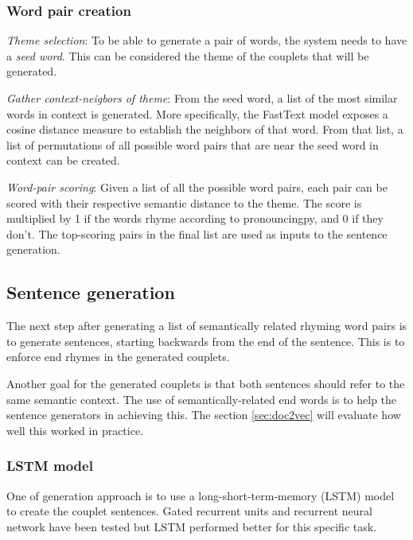 \documentclass[11pt,a4paper]{article}
\newenvironment{tight_enumerate}{
\begin{enumerate}
\setlength{\itemsep}{0pt}
\setlength{\parskip}{0pt}
}{\end{enumerate}}
\begin{document}
\subsubsection{Word pair creation}
\begin{tight_enumerate}
	\item \textit{Theme selection}: To be able to generate a pair of words, the system needs to have a \textit{seed word}. This can be considered the theme of the couplets that will be generated.
	\item \textit{Gather context-neigbors of theme}: From the seed word, a list of the most similar words in context is generated. More specifically, the FastText model exposes a cosine distance measure to establish the neighbors of that word. From that list, a list of permutations of all possible word pairs that are near the seed word in context can be created.
	\item \textit{Word-pair scoring}: Given a list of all the possible word pairs, each pair can be scored with their respective semantic distance to the theme. The score is multiplied by 1 if the words rhyme according to pronouncingpy, and 0 if they don't. The top-scoring pairs in the final list are used as inputs to the sentence generation.
\end{tight_enumerate}

\subsection{Sentence generation}
\label{sec:languagegen}

The next step after generating a list of semantically related rhyming word pairs is to generate sentences, starting backwards from the end of the sentence. This is to enforce end rhymes in the generated couplets.

Another goal for the generated couplets is that both sentences should refer to the same semantic context. The use of semantically-related end words is to help the sentence generators in achieving this. The section \ref{sec:doc2vec} will evaluate how well this worked in practice.

\subsubsection{LSTM model}
\label{sec:lstm}
One of generation approach is to use a long-short-term-memory (LSTM) model \cite{lstm} to create the couplet sentences. Gated recurrent units and recurrent neural network have been tested but LSTM performed better for this specific task.
\end{document}

